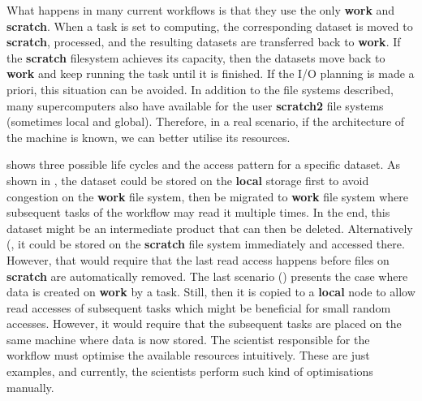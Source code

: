 \documentclass[a4paper]{article}
\begin{document}
What happens in many current workflows is that they use the only \textbf{work} and \textbf{scratch}.
When a task is set to computing, the corresponding dataset is moved to \textbf{scratch}, processed, and the resulting datasets are transferred back to \textbf{work}.
If the \textbf{scratch} filesystem achieves its capacity, then the datasets move back to \textbf{work} and keep running the task until it is finished.
If the I/O planning is made a priori, this situation can be avoided.
In addition to the file systems described, many supercomputers also have available for the user \textbf{scratch2} file systems (sometimes local and global).
Therefore, in a real scenario, if the architecture of the machine is known, we can better utilise its resources.

 shows three possible life cycles and the access pattern for a specific dataset.
As shown in , the dataset could be stored on the \textbf{local} storage first to avoid congestion on the \textbf{work} file system, then be migrated to \textbf{work} file system where subsequent tasks of the workflow may read it multiple times.
In the end, this dataset might be an intermediate product that can then be deleted.
Alternatively (, it could be stored on the \textbf{scratch} file system immediately and accessed there.
However, that would require that the last read access happens before files on \textbf{scratch} are automatically removed.
The last scenario () presents the case where data is created on \textbf{work} by a task. Still, then it is copied to a \textbf{local} node to allow read accesses of subsequent tasks which might be beneficial for small random accesses.
However, it would require that the subsequent tasks are placed on the same machine where data is now stored.
The scientist responsible for the workflow must optimise the available resources intuitively.
These are just examples, and currently, the scientists perform such kind of optimisations manually.
\end{document}
